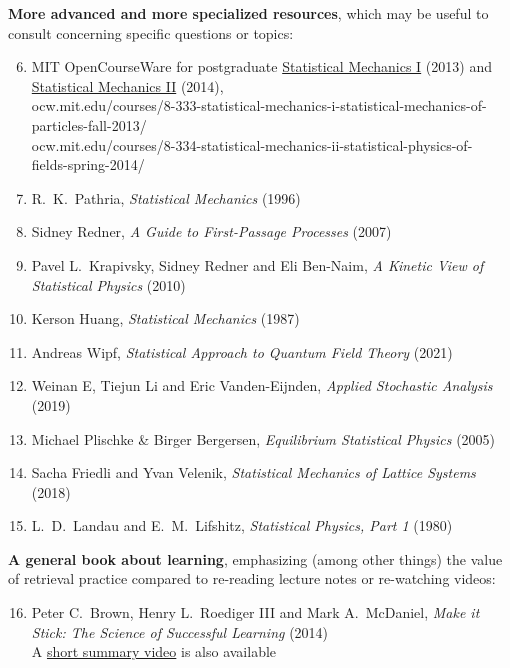 \noindent\textbf{More advanced and more specialized resources}, which may be useful to consult concerning specific questions or topics: \\[-24 pt]
\begin{enumerate}
  \setcounter{enumi}{5}
  \item MIT OpenCourseWare for postgraduate \href{https://ocw.mit.edu/courses/8-333-statistical-mechanics-i-statistical-mechanics-of-particles-fall-2013/}{Statistical Mechanics I} (2013) and \href{https://ocw.mit.edu/courses/8-334-statistical-mechanics-ii-statistical-physics-of-fields-spring-2014/}{Statistical Mechanics II} (2014), \\ ocw.mit.edu/courses/8-333-statistical-mechanics-i-statistical-mechanics-of- \\ particles-fall-2013/ \\ ocw.mit.edu/courses/8-334-statistical-mechanics-ii-statistical-physics-of- \\ fields-spring-2014/
  \item R.~K.~Pathria, \textit{Statistical Mechanics} (1996)
  \item Sidney Redner, \textit{A Guide to First-Passage Processes} (2007)
  \item Pavel L.~Krapivsky, Sidney Redner and Eli Ben-Naim, \textit{A Kinetic View of Statistical Physics} (2010)
  \item Kerson Huang, \textit{Statistical Mechanics} (1987)
  \item Andreas Wipf, \textit{Statistical Approach to Quantum Field Theory} (2021)
  \item Weinan E, Tiejun Li and Eric Vanden-Eijnden, \textit{Applied Stochastic Analysis} (2019)
  \item Michael Plischke \& Birger Bergersen, \textit{Equilibrium Statistical Physics} (2005)
  \item Sacha Friedli and Yvan Velenik, \textit{Statistical Mechanics of Lattice Systems} (2018)
  \item L.~D.~Landau and E.~M.~Lifshitz, \textit{Statistical Physics, Part 1} (1980)
\end{enumerate}

\noindent\textbf{A general book about learning}, emphasizing (among other things) the value of retrieval practice compared to re-reading lecture notes or re-watching videos: \\[-24 pt]
\begin{enumerate}
  \setcounter{enumi}{15}
  \item Peter C.~Brown, Henry L.~Roediger III and Mark A.~McDaniel, \textit{Make it Stick: The Science of Successful Learning} (2014) \\
        A \href{https://www.youtube.com/watch?v=MfylloWuuZU}{short summary video} is also available
\end{enumerate}

